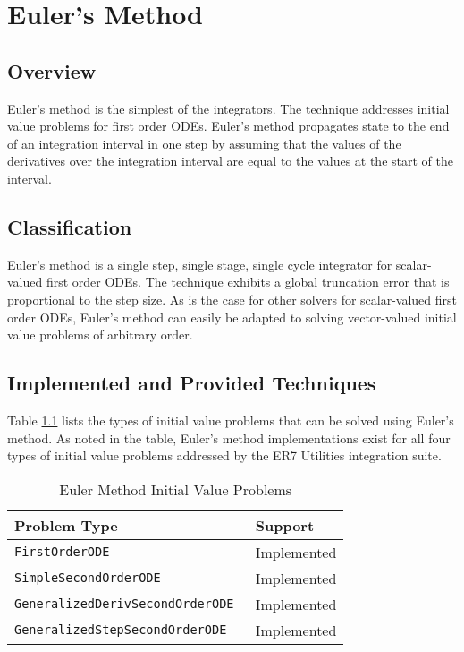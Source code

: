 \chapter{Euler's Method}\label{app:euler}

\section{Overview}

Euler's method is the simplest of the integrators.
The technique addresses initial value problems for first order ODEs.
Euler's method propagates state to the end of an integration interval
in one step by assuming that the values of the derivatives over the
integration interval are equal to the values at the start of the interval.

\section{Classification}

Euler's method is a single step, single stage, single cycle integrator
for scalar-valued first order ODEs.
The technique exhibits a global truncation error that is
proportional to the step size.
As is the case for other solvers for scalar-valued first order ODEs, Euler's
method can easily be adapted to solving vector-valued initial value problems
of arbitrary order.

\section{Implemented and Provided Techniques}

Table \ref{tab:euler_method_problems} lists the types of initial value problems
that can be solved using Euler's method.
As noted in the table, Euler's method implementations exist
for all four types of initial value problems addressed by the
ER7 Utilities integration suite.

\begin{table}[htp]
\centering
\caption{Euler Method Initial Value Problems}
\label{tab:euler_method_problems}
\vspace{1ex}
\begin{tabular}{ll}\hline
\bf{Problem Type} & \bf{Support} \\
\hline\hline
\tt{FirstOrderODE} & Implemented \\
\tt{SimpleSecondOrderODE} & Implemented \\
\tt{GeneralizedDerivSecondOrderODE} & Implemented \\
\tt{GeneralizedStepSecondOrderODE} & Implemented \\
\hline
\end{tabular}
\end{table}

